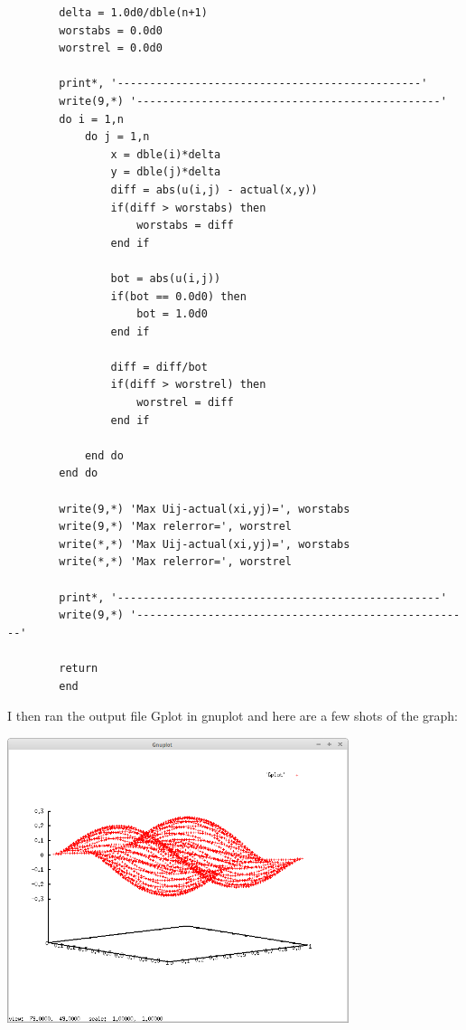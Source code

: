 \documentclass{article}
\begin{document}
\begin{verbatim}
		delta = 1.0d0/dble(n+1)
		worstabs = 0.0d0 
		worstrel = 0.0d0 

		print*, '-----------------------------------------------'
		write(9,*) '-----------------------------------------------'
		do i = 1,n 
			do j = 1,n 
				x = dble(i)*delta 
				y = dble(j)*delta 
				diff = abs(u(i,j) - actual(x,y))
				if(diff > worstabs) then 
					worstabs = diff 
				end if
				
				bot = abs(u(i,j))
				if(bot == 0.0d0) then
					bot = 1.0d0 
				end if 
				
				diff = diff/bot 
				if(diff > worstrel) then 
					worstrel = diff 
				end if 
				
			end do
		end do 

		write(9,*) 'Max Uij-actual(xi,yj)=', worstabs
		write(9,*) 'Max relerror=', worstrel
		write(*,*) 'Max Uij-actual(xi,yj)=', worstabs
		write(*,*) 'Max relerror=', worstrel

		print*, '--------------------------------------------------'
		write(9,*) '----------------------------------------------------'

		return 
		end 

	\end{verbatim}
	
	I then ran the output file Gplot in gnuplot and here are a few shots of the graph:
	
	\begin{center}
		\includegraphics[width=0.75\textwidth]{pr1_1.png}
	\end{center}
		
\end{document}
